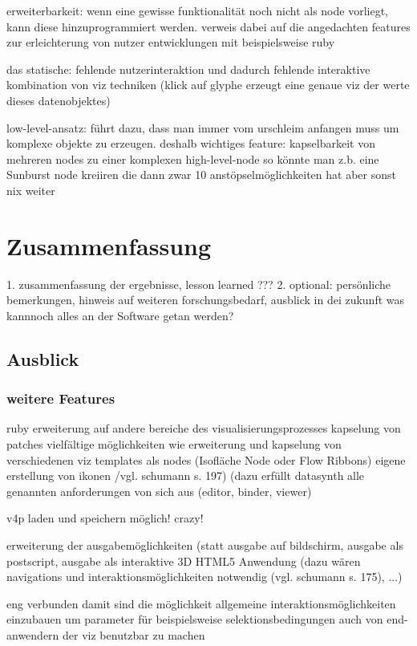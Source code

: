 \documentclass[a4paper, 12pt, onepage, pdftex, headsepline, footsepline]{scrreprt}
\begin{document}
erweiterbarkeit:
wenn eine gewisse funktionalität noch nicht als node vorliegt, kann diese hinzuprogrammiert werden. verweis dabei auf die angedachten features zur erleichterung von nutzer entwicklungen mit beispielsweise ruby

das statische:
fehlende nutzerinteraktion und dadurch fehlende interaktive kombination von viz techniken (klick auf glyphe erzeugt eine genaue viz der werte dieses datenobjektes)

low-level-ansatz:
führt dazu, dass man immer vom urschleim anfangen muss um komplexe objekte zu erzeugen. deshalb wichtiges feature: kapselbarkeit von mehreren nodes zu einer komplexen high-level-node
so könnte man z.b. eine Sunburst node kreiiren die dann zwar 10 anstöpselmöglichkeiten hat aber sonst nix weiter


\chapter{Zusammenfassung}
1. zusammenfassung der ergebnisse, lesson learned
???
2. optional: persönliche bemerkungen, hinweis auf weiteren forschungsbedarf, ausblick in dei zukunft
was kannnoch alles an der Software getan werden?
\section{Ausblick}
\subsection{weitere Features}
ruby
erweiterung auf andere bereiche des visualisierungsprozesses
kapselung von patches
  vielfältige möglichkeiten wie
    erweiterung und kapselung von verschiedenen viz templates als nodes (Isofläche Node oder Flow Ribbons)
    eigene erstellung von ikonen /vgl. schumann s. 197)
    (dazu erfüllt datasynth alle genannten anforderungen von sich aus (editor, binder, viewer)

v4p laden und speichern möglich! crazy!

erweiterung der ausgabemöglichkeiten (statt ausgabe auf bildschirm, ausgabe als postscript, ausgabe als interaktive 3D HTML5 Anwendung (dazu wären navigations und interaktionsmöglichkeiten notwendig (vgl. schumann s. 175), ...)

eng verbunden damit sind die möglichkeit allgemeine interaktionsmöglichkeiten einzubauen um parameter für beispielsweise selektionsbedingungen auch von end-anwendern der viz benutzbar zu machen
\end{document}
